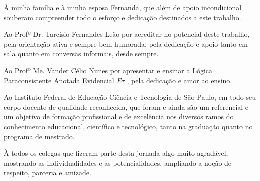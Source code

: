 À minha família e à minha esposa Fernanda, 
que além de apoio incondicional souberam 
compreender todo o esforço e dedicação destinados a este trabalho.

Ao Profº Dr. Tarcisio Fernandes Leão 
por acreditar no potencial deste trabalho,
pela orientação ativa e sempre bem humorada, 
pela dedicação e apoio tanto em sala quanto em conversas informais, 
desde sempre. 

Ao Profº Me. Vander Célio Nunes por apresentar e ensinar a 
Lógica Paraconsistente Anotada Evidencial $E\tau$ , 
pela dedicação e amor ao ensino.

Ao Instituto Federal de Educação Ciência e Tecnologia de São Paulo, 
em todo seu corpo docente de qualidade reconhecida, 
que foram e ainda são um referencial e um objetivo 
de formação profissional e de excelência nos diversos ramos 
do conhecimento educacional, científico e tecnológico, 
tanto na graduação quanto no programa de mestrado. 


À todos os colegas que fizeram parte desta jornada algo muito agradável, 
mostrando as individualidades e as potencialidades, 
ampliando a noção de respeito, parceria e amizade. 

 
